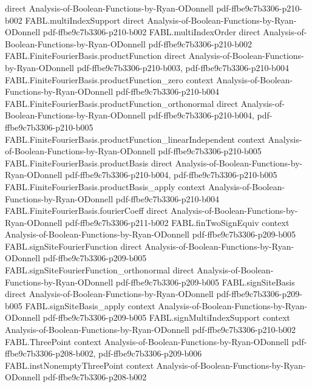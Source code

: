 \begin{theorem}
  {direct}
  {Analysis-of-Boolean-Functions-by-Ryan-ODonnell}
  {pdf-ffbe9c7b3306-p210-b002}
\proofstep
  {FABL.multiIndexSupport}
  {direct}
  {Analysis-of-Boolean-Functions-by-Ryan-ODonnell}
  {pdf-ffbe9c7b3306-p210-b002}
\proofstep
  {FABL.multiIndexOrder}
  {direct}
  {Analysis-of-Boolean-Functions-by-Ryan-ODonnell}
  {pdf-ffbe9c7b3306-p210-b002}
\proofstep
  {FABL.FiniteFourierBasis.productFunction}
  {direct}
  {Analysis-of-Boolean-Functions-by-Ryan-ODonnell}
  {pdf-ffbe9c7b3306-p210-b003,
    pdf-ffbe9c7b3306-p210-b004}
\proofstep
  {FABL.FiniteFourierBasis.productFunction_zero}
  {context}
  {Analysis-of-Boolean-Functions-by-Ryan-ODonnell}
  {pdf-ffbe9c7b3306-p210-b004}
\proofstep
  {FABL.FiniteFourierBasis.productFunction_orthonormal}
  {direct}
  {Analysis-of-Boolean-Functions-by-Ryan-ODonnell}
  {pdf-ffbe9c7b3306-p210-b004,
    pdf-ffbe9c7b3306-p210-b005}
\proofstep
  {FABL.FiniteFourierBasis.productFunction_linearIndependent}
  {context}
  {Analysis-of-Boolean-Functions-by-Ryan-ODonnell}
  {pdf-ffbe9c7b3306-p210-b005}
\proofstep
  {FABL.FiniteFourierBasis.productBasis}
  {direct}
  {Analysis-of-Boolean-Functions-by-Ryan-ODonnell}
  {pdf-ffbe9c7b3306-p210-b004,
    pdf-ffbe9c7b3306-p210-b005}
\proofstep
  {FABL.FiniteFourierBasis.productBasis_apply}
  {context}
  {Analysis-of-Boolean-Functions-by-Ryan-ODonnell}
  {pdf-ffbe9c7b3306-p210-b004}
\proofstep
  {FABL.FiniteFourierBasis.fourierCoeff}
  {direct}
  {Analysis-of-Boolean-Functions-by-Ryan-ODonnell}
  {pdf-ffbe9c7b3306-p211-b002}
\proofstep
  {FABL.finTwoSignEquiv}
  {context}
  {Analysis-of-Boolean-Functions-by-Ryan-ODonnell}
  {pdf-ffbe9c7b3306-p209-b005}
\proofstep
  {FABL.signSiteFourierFunction}
  {direct}
  {Analysis-of-Boolean-Functions-by-Ryan-ODonnell}
  {pdf-ffbe9c7b3306-p209-b005}
\proofstep
  {FABL.signSiteFourierFunction_orthonormal}
  {direct}
  {Analysis-of-Boolean-Functions-by-Ryan-ODonnell}
  {pdf-ffbe9c7b3306-p209-b005}
\proofstep
  {FABL.signSiteBasis}
  {direct}
  {Analysis-of-Boolean-Functions-by-Ryan-ODonnell}
  {pdf-ffbe9c7b3306-p209-b005}
\proofstep
  {FABL.signSiteBasis_apply}
  {context}
  {Analysis-of-Boolean-Functions-by-Ryan-ODonnell}
  {pdf-ffbe9c7b3306-p209-b005}
\proofstep
  {FABL.signMultiIndexSupport}
  {context}
  {Analysis-of-Boolean-Functions-by-Ryan-ODonnell}
  {pdf-ffbe9c7b3306-p210-b002}
\proofstep
  {FABL.ThreePoint}
  {context}
  {Analysis-of-Boolean-Functions-by-Ryan-ODonnell}
  {pdf-ffbe9c7b3306-p208-b002,
    pdf-ffbe9c7b3306-p209-b006}
\proofstep
  {FABL.instNonemptyThreePoint}
  {context}
  {Analysis-of-Boolean-Functions-by-Ryan-ODonnell}
  {pdf-ffbe9c7b3306-p208-b002}

\end{theorem}
